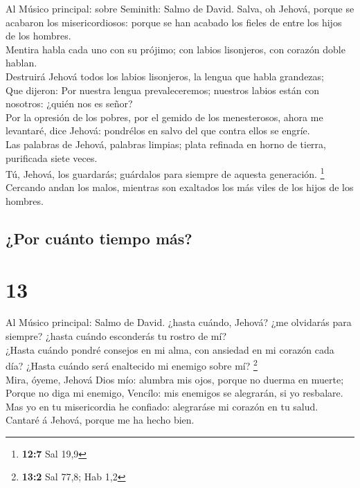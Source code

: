  Al Músico principal: sobre Seminith: Salmo de David.
Salva, oh Jehová, porque se acabaron los misericordiosos: porque se han
acabado los fieles de entre los hijos de los hombres.\\
 Mentira habla cada uno con su prójimo; con labios
lisonjeros, con corazón doble hablan.\\
 Destruirá Jehová todos los labios lisonjeros, la lengua
que habla grandezas;\\
 Que dijeron: Por nuestra lengua prevaleceremos; nuestros
labios están con nosotros: ¿quién nos es señor?\\
 Por la opresión de los pobres, por el gemido de los
menesterosos, ahora me levantaré, dice Jehová: pondrélos en salvo del
que contra ellos se engríe.\\
 Las palabras de Jehová, palabras limpias; plata refinada
en horno de tierra, purificada siete veces.\\
 Tú, Jehová, los guardarás; guárdalos para siempre de
aquesta generación. \footnote{\textbf{12:7} Sal 19,9}\\
 Cercando andan los malos, mientras son exaltados los más
viles de los hijos de los hombres.

\hypertarget{por-cuuxe1nto-tiempo-muxe1s}{%
\subsection{¿Por cuánto tiempo más?}\label{por-cuuxe1nto-tiempo-muxe1s}}

\hypertarget{section-12}{%
\section{13}\label{section-12}}

 Al Músico principal: Salmo de David. ¿hasta cuándo,
Jehová? ¿me olvidarás para siempre? ¿hasta cuándo esconderás tu rostro
de mí?\\
 ¿Hasta cuándo pondré consejos en mi alma, con ansiedad en
mi corazón cada día? ¿Hasta cuándo será enaltecido mi enemigo sobre mí?
\footnote{\textbf{13:2} Sal 77,8; Hab 1,2}\\
 Mira, óyeme, Jehová Dios mío: alumbra mis ojos, porque no
duerma en muerte;\\
 Porque no diga mi enemigo, Vencílo: mis enemigos se
alegrarán, si yo resbalare.\\
 Mas yo en tu misericordia he confiado: alegraráse mi
corazón en tu salud.\\
 Cantaré á Jehová, porque me ha hecho bien.

